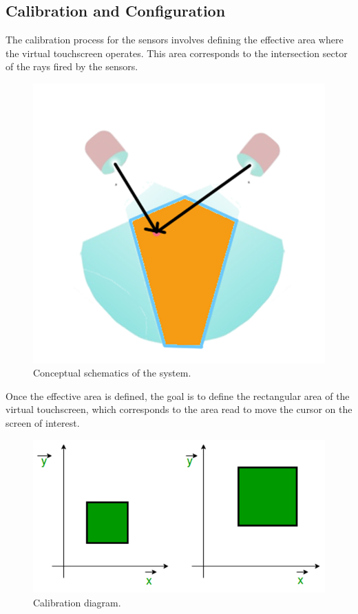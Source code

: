\documentclass[12pt,a4paper]{article}
\begin{document}
\subsection{Calibration and Configuration}
The calibration process for the sensors involves defining the effective area where the virtual touchscreen operates. This area corresponds to the intersection sector of the rays fired by the sensors.

\begin{figure}[!htp]
    \centering
    \includegraphics[scale=0.3]{../IoT Materials/article images/3-Concept-schematics.png}
    \caption{Conceptual schematics of the system.}
\end{figure}

Once the effective area is defined, the goal is to define the rectangular area of the virtual touchscreen, which corresponds to the area read to move the cursor on the screen of interest.

\begin{figure}[!htp]
    \centering
    \includegraphics[scale=0.3]{../IoT Materials/article images/4-Calibration-diagram.png}
    \caption{Calibration diagram.}
\end{figure}
\end{document}
